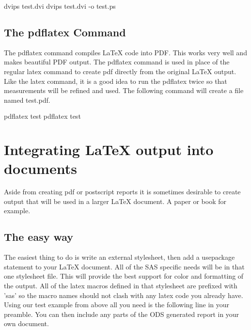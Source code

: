 \begin{sfvcode}
        dvips test.dvi
        dvips test.dvi -o test.ps
\end{sfvcode}

\subsection{The pdflatex Command}
The pdflatex command compiles LaTeX code into PDF.  This works very
well and makes beautiful PDF output.  The pdflatex command is used
in place of the regular latex command to create pdf directly from the
original LaTeX output.  Like the latex command, it is a good idea to
run the pdflatex twice so that measurements will be refined and used.
The following command will create a file named test.pdf.

\begin{sfvcode}
        pdflatex test
        pdflatex test
\end{sfvcode}

\section{Integrating LaTeX output into documents}
Aside from creating pdf or postscript reports it is sometimes
desirable to create output that will be used in a larger 
LaTeX document.  A paper or book for example.

\subsection{The easy way}
The easiest thing to do is write an external stylesheet, then add
a usepackage statement to your LaTeX document.  All of the SAS specific
needs will be in that one stylesheet file.  This will provide the best
support for color and formatting of the output.  All of the latex macros
defined in that stylesheet are prefixed with 'sas' so the macro names 
should not clash with any latex code you already have.  Using our test
example from above all you need is the following line in your preamble.
You can then include any parts of the ODS generated report in your own
document.

\begin{sfvcode}
   \usepackage[color]{test}
\end{sfvcode}


